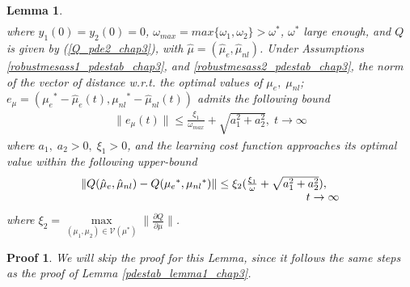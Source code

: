 \documentclass[letterpaper,conference,onecolumn,11pt]{IEEEtran}
\newtheorem{lemma}{Lemma}
\newtheorem{pf}{Proof}
\begin{document}
\begin{lemma}
\begin{equation}
\begin{array}{l}
\label{pdestab_mes_2_chap3}
\end{array}
\end{equation}
where $y_{1}(0)=y_{2}(0)=0$,
$\omega_{max}=max\{\omega_{1},\omega_{2}\}>\omega^{*}$,
$\omega^{*}$ large enough, and $Q$ is given by
(\ref{Q_pde2_chap3}), with
$\hat\mu=({\hat\mu}_{e},{\hat\mu}_{nl})$. Under Assumptions
\ref{robustmesass1_pdestab_chap3}, and
\ref{robustmesass2_pdestab_chap3}, the norm of the vector of
distance w.r.t. the optimal values of $\mu_{e},\;\mu_{nl}$;
 $e_{\mu}=({\mu_{e}}^{*}-{\hat\mu}_{e}(t),{\mu_{nl}}^{*}-{\hat\mu}_{nl}(t))$ admits the following bound
\begin{equation}
\begin{array}{l}
\|e_{\mu}(t)\|\leq\frac{\xi_{1}}{\omega_{max}}+\sqrt{a_{1}^{2}+a_{2}^{2}},\;t\rightarrow\infty
\end{array}\label{pdestab_mes_bound3_chap3}
\end{equation}
where $a_{1},\;a_{2}>0,\;\xi_{1}>0$, and the learning cost
function approaches its optimal value within the following
upper-bound
\begin{equation}
\begin{array}{l}
\|Q({\hat\mu}_{e},{\hat\mu}_{nl})-Q({\mu_{e}}^{*},{\mu_{nl}}^{*})\|\leq\xi_{2}(\frac{\xi_{1}}{\omega}+\sqrt{a_{1}^{2}+a_{2}^{2}}),\\\hspace{+7cm}t\rightarrow\infty
\end{array}\label{pdestab_mes_bound4_chap3}
\end{equation}
where
$\xi_{2}=\underset{(\mu_{1},\mu_{2})\in\mathcal{V}(\mu^{*})}\max
 \| \frac{\partial{Q}}{\partial\mu} \|$.
\end{lemma}
\begin{pf}
We will skip the proof for this Lemma, since it follows the same
steps as the proof of Lemma \ref{pdestab_lemma1_chap3}.
\end{pf}
\end{document}
